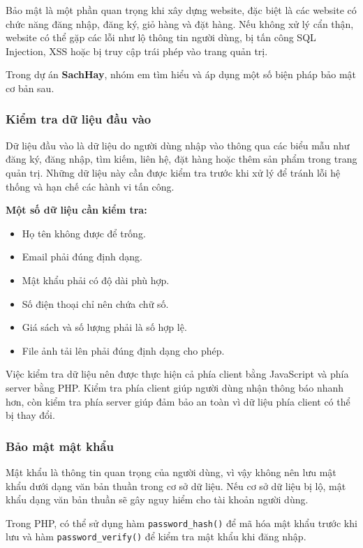 Bảo mật là một phần quan trọng khi xây dựng website, đặc biệt là các website có chức năng đăng nhập, đăng ký, giỏ hàng và đặt hàng. Nếu không xử lý cẩn thận, website có thể gặp các lỗi như lộ thông tin người dùng, bị tấn công SQL Injection, XSS hoặc bị truy cập trái phép vào trang quản trị.

Trong dự án \textbf{SachHay}, nhóm em tìm hiểu và áp dụng một số biện pháp bảo mật cơ bản sau.

\subsubsection{Kiểm tra dữ liệu đầu vào}

Dữ liệu đầu vào là dữ liệu do người dùng nhập vào thông qua các biểu mẫu như đăng ký, đăng nhập, tìm kiếm, liên hệ, đặt hàng hoặc thêm sản phẩm trong trang quản trị. Những dữ liệu này cần được kiểm tra trước khi xử lý để tránh lỗi hệ thống và hạn chế các hành vi tấn công.

\textbf{Một số dữ liệu cần kiểm tra:}

\begin{itemize}
	\item Họ tên không được để trống.
	\item Email phải đúng định dạng.
	\item Mật khẩu phải có độ dài phù hợp.
	\item Số điện thoại chỉ nên chứa chữ số.
	\item Giá sách và số lượng phải là số hợp lệ.
	\item File ảnh tải lên phải đúng định dạng cho phép.
\end{itemize}

Việc kiểm tra dữ liệu nên được thực hiện cả phía client bằng JavaScript và phía server bằng PHP. Kiểm tra phía client giúp người dùng nhận thông báo nhanh hơn, còn kiểm tra phía server giúp đảm bảo an toàn vì dữ liệu phía client có thể bị thay đổi.

\subsubsection{Bảo mật mật khẩu}

Mật khẩu là thông tin quan trọng của người dùng, vì vậy không nên lưu mật khẩu dưới dạng văn bản thuần trong cơ sở dữ liệu. Nếu cơ sở dữ liệu bị lộ, mật khẩu dạng văn bản thuần sẽ gây nguy hiểm cho tài khoản người dùng.

Trong PHP, có thể sử dụng hàm \texttt{password\_hash()} để mã hóa mật khẩu trước khi lưu và hàm \texttt{password\_verify()} để kiểm tra mật khẩu khi đăng nhập.


